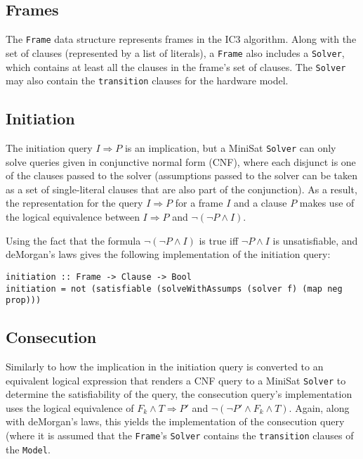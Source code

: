\documentclass[12pt,a4paper,twoside,openright]{report}
\begin{document}
\subsection{Frames}
The \verb,Frame, data structure represents frames in the IC3 algorithm.
Along with the set of clauses (represented by a list of literals), a \verb,Frame, also includes
a \verb,Solver,, which contains at least all the clauses in the frame's set of clauses. The
\verb,Solver, may also contain the \verb,transition, clauses for the hardware model.

\subsection{Initiation}

The initiation query $I \Rightarrow P$ is an implication, but a MiniSat \verb,Solver, can only
solve queries given in conjunctive normal form (CNF), where each disjunct is one of the clauses passed
to the solver (assumptions passed to the solver can be taken as a set of single-literal clauses
that are also part of the conjunction). As a result, the representation for the query
$I \Rightarrow P$ for a frame $I$ and a clause $P$ makes use of the logical equivalence between
$I \Rightarrow P$ and $\neg (\neg P \wedge I)$.

Using the fact that the formula $\neg (\neg P \wedge I)$ is true iff $\neg P \wedge I$ is unsatisfiable,
and deMorgan's laws gives the following implementation of the initiation query:

\begin{verbatim}
initiation :: Frame -> Clause -> Bool
initiation = not (satisfiable (solveWithAssumps (solver f) (map neg prop)))
\end{verbatim}

\subsection{Consecution}

Similarly to how the implication in the initiation query is converted to an equivalent logical
expression that renders a CNF query to a MiniSat \verb,Solver, to determine the satisfiability
of the query, the consecution query's implementation uses the logical equivalence of
$F_k \wedge T \Rightarrow P'$ and $\neg (\neg P' \wedge F_k \wedge T)$. Again, along with deMorgan's
laws, this yields the implementation of the consecution query (where it is assumed that the
\verb,Frame,'s \verb,Solver, contains the \verb,transition, clauses of the \verb,Model,.
\end{document}
